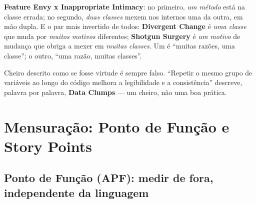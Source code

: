 \begin{cuidado}
\textbf{Feature Envy x Inappropriate Intimacy}: no primeiro, \emph{um método}
está na classe errada; no segundo, \emph{duas classes} mexem nos internos uma
da outra, em mão dupla. E o par mais invertido de todos:
\textbf{Divergent Change} é \emph{uma classe} que muda por \emph{muitos
motivos} diferentes; \textbf{Shotgun Surgery} é \emph{um motivo} de mudança
que obriga a mexer em \emph{muitas classes}. Um é “muitas razões, uma
classe”; o outro, “uma razão, muitas classes”.
\end{cuidado}

\begin{regrapratica}
Cheiro descrito como se fosse virtude é sempre falso. “Repetir o mesmo grupo
de variáveis ao longo do código melhora a legibilidade e a consistência”
descreve, palavra por palavra, \textbf{Data Clumps} --- um cheiro, não uma
boa prática.
\end{regrapratica}

\section{Mensuração: Ponto de Função e Story Points}

\subsection{Ponto de Função (APF): medir de fora, independente da linguagem}

